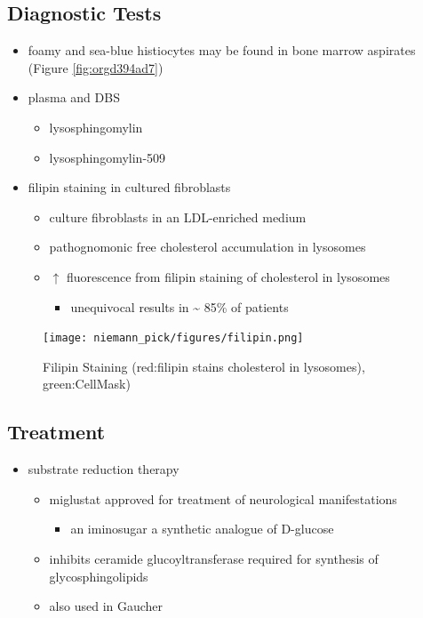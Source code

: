 \documentclass[12pt]{scrartcl}
\begin{document}
\subsection{Diagnostic Tests}
\label{sec:org26fb0fe}
\begin{itemize}
\item foamy and sea-blue histiocytes may be found in bone marrow aspirates
(Figure \ref{fig:orgd394ad7})
\item plasma and DBS
\begin{itemize}
\item lysosphingomylin
\item lysosphingomylin-509
\end{itemize}
\item filipin staining in cultured fibroblasts
\begin{itemize}
\item culture fibroblasts in an LDL-enriched medium
\item pathognomonic free cholesterol accumulation in lysosomes
\item \(\uparrow\) fluorescence from filipin staining of cholesterol in lysosomes 
\begin{itemize}
\item unequivocal results in \textasciitilde{} 85\% of patients
\end{itemize}
\end{itemize}
\end{itemize}


\begin{figure}[htbp]
\centering
\texttt{[image: niemann\_pick/figures/filipin.png]}
\caption{\label{fig:org998be9e}Filipin Staining (red:filipin stains cholesterol in lysosomes), green:CellMask)}
\end{figure}

\subsection{Treatment}
\label{sec:org6899ffc}
\begin{itemize}
\item substrate reduction therapy
\begin{itemize}
\item miglustat approved for treatment of neurological manifestations
\begin{itemize}
\item an iminosugar a synthetic analogue of D-glucose
\end{itemize}
\item inhibits ceramide glucoyltransferase required for synthesis of
glycosphingolipids
\item also used in Gaucher
\end{itemize}
\end{itemize}
\end{document}

